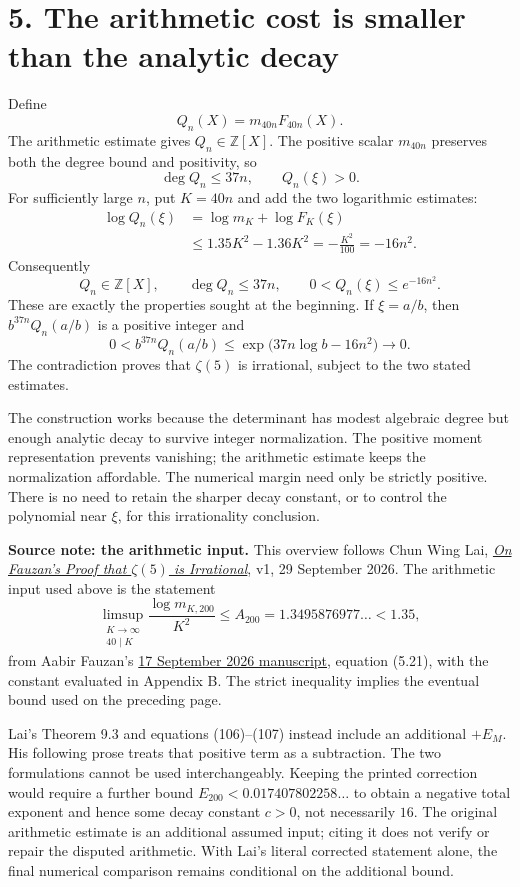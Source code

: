 \documentclass[11pt]{article}
\newcommand{\Z}{\mathbb Z}
\begin{document}
\newpage
\section*{5. The arithmetic cost is smaller than the analytic decay}
Define
\[
 Q_n(X)=m_{40n}F_{40n}(X).
\]
The arithmetic estimate gives $Q_n\in\Z[X]$. The positive scalar $m_{40n}$
preserves both the degree bound and positivity, so
\[
 \deg Q_n\leq37n,\qquad Q_n(\xi)>0.
\]
For sufficiently large $n$, put $K=40n$ and add the two logarithmic estimates:
\begin{align*}
 \log Q_n(\xi)
 &=\log m_K+\log F_K(\xi)\\
 &\leq1.35K^2-1.36K^2
 =-\frac{K^2}{100}
 =-16n^2.
\end{align*}
Consequently
\[
 \boxed{Q_n\in\Z[X],\qquad \deg Q_n\leq37n,
        \qquad 0<Q_n(\xi)\leq e^{-16n^2}.}
\]
These are exactly the properties sought at the beginning. If $\xi=a/b$,
then $b^{37n}Q_n(a/b)$ is a positive integer and
\[
 0<b^{37n}Q_n(a/b)
 \leq\exp\bigl(37n\log b-16n^2\bigr)\longrightarrow0.
\]
The contradiction proves that $\zeta(5)$ is irrational, subject to the two
stated estimates.

The construction works because the determinant has modest algebraic degree
but enough analytic decay to survive integer normalization. The positive
moment representation prevents vanishing; the arithmetic estimate keeps
the normalization affordable. The numerical margin need only be strictly
positive. There is no need to retain the sharper decay constant, or to
control the polynomial near $\xi$, for this irrationality conclusion.

\bigskip
\textbf{Source note: the arithmetic input.}
This overview follows Chun Wing Lai,
\href{https://ai.vixra.org/pdf/2609.0080v1.pdf}{\emph{On Fauzan's Proof that
$\zeta(5)$ is Irrational}}, v1, 29 September 2026.
The arithmetic input used above is the statement
\[
 \limsup_{\substack{K\to\infty\\40\mid K}}
       \frac{\log m_{K,200}}{K^2}
 \leq A_{200}=1.3495876977\ldots<1.35,
\]
from Aabir Fauzan's
\href{https://zenodo.org/records/22826419}{17 September 2026 manuscript},
equation (5.21), with the constant evaluated in Appendix B. The strict
inequality implies the eventual bound used on the preceding page.

Lai's Theorem 9.3 and equations (106)--(107) instead include an additional
$+E_M$. His following prose treats that positive term as a subtraction.
The two formulations cannot be used interchangeably. Keeping the printed
correction would require a further bound
$E_{200}<0.017407802258\ldots$ to obtain a negative total exponent and hence
some decay constant $c>0$, not necessarily $16$.
The original arithmetic estimate is an additional assumed input; citing it
does not verify or repair the disputed arithmetic. With Lai's literal
corrected statement alone, the final numerical comparison remains
conditional on the additional bound.
\end{document}
